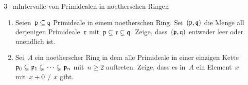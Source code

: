\documentclass[entwurf]{uebblatt}
\begin{document}

\begin{aufgabe}{3+m}{Intervalle von Primidealen in noetherschen Ringen}
\begin{enumerate}
\item
Seien~$\mathfrak{p} \subseteq \mathfrak{q}$ Primideale in einem
noetherschen Ring. Sei~$(\mathfrak{p},\mathfrak{q})$ die Menge all derjenigen Primideale~$\mathfrak{r}$
mit~$\mathfrak{p} \subsetneq \mathfrak{r} \subsetneq \mathfrak{q}$. Zeige, dass~$(\mathfrak{p},\mathfrak{q})$ entweder
leer oder unendlich ist.
\item Sei~$A$ ein noetherscher Ring in dem alle Primideale in einer einzigen Kette~$\mathfrak{p}_0
\subsetneq \mathfrak{p}_1 \subsetneq \cdots \subsetneq \mathfrak{p}_n$ mit~$n \geq 2$ auftreten.
Zeige, dass es in~$A$ ein Element~$x$ mit~$x + 0 \neq x$ gibt.
\end{enumerate}
\end{aufgabe}
\end{document}
